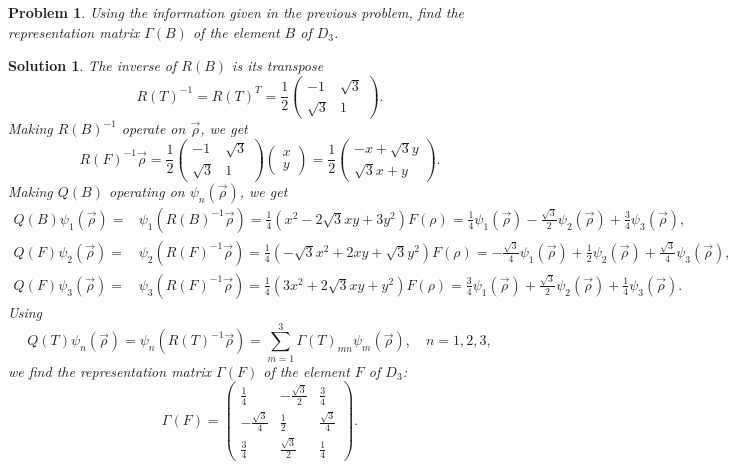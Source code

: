 \documentclass[UTF8,10pt,a4paper]{article}
\theoremstyle{Problem}
\newtheorem{prob}{Problem}
\theoremstyle{Solution}
\newtheorem*{sol}{Solution}
\begin{document}
\begin{prob}
    Using the information given in the previous problem, find the representation matrix $\Gamma(B)$ of the element $B$ of $D_3$.
\end{prob}
\begin{sol}
    The inverse of $R(B)$ is its transpose
    \begin{equation}
        R(T)^{-1}=R(T)^T=\frac{1}{2}\left(\begin{matrix}
            -1&\sqrt{3}\\
            \sqrt{3}&1
        \end{matrix}\right).
    \end{equation}
    Making $R(B)^{-1}$ operate on $\vec{\rho}$, we get
    \begin{equation}
        R(F)^{-1}\vec{\rho}=\frac{1}{2}\left(\begin{matrix}
            -1&\sqrt{3}\\
            \sqrt{3}&1
        \end{matrix}\right)\left(\begin{matrix}
            x\\
            y
        \end{matrix}\right)=\frac{1}{2}\left(\begin{matrix}
            -x+\sqrt{3}y\\
            \sqrt{3}x+y
        \end{matrix}\right).
    \end{equation}
    Making $Q(B)$ operating on $\psi_n(\vec{\rho})$, we get
    \begin{align}
        Q(B)\psi_1(\vec{\rho})=&\psi_1(R(B)^{-1}\vec{\rho})=\frac{1}{4}(x^2-2\sqrt{3}xy+3y^2)F(\rho)=\frac{1}{4}\psi_1(\vec{\rho})-\frac{\sqrt{3}}{2}\psi_2(\vec{\rho})+\frac{3}{4}\psi_3(\vec{\rho}),\\
        Q(F)\psi_2(\vec{\rho})=&\psi_2(R(F)^{-1}\vec{\rho})=\frac{1}{4}(-\sqrt{3}x^2+2xy+\sqrt{3}y^2)F(\rho)=-\frac{\sqrt{3}}{4}\psi_1(\vec{\rho})+\frac{1}{2}\psi_2(\vec{\rho})+\frac{\sqrt{3}}{4}\psi_3(\vec{\rho}),\\
        Q(F)\psi_3(\vec{\rho})=&\psi_3(R(F)^{-1}\vec{\rho})=\frac{1}{4}(3x^2+2\sqrt{3}xy+y^2)F(\rho)=\frac{3}{4}\psi_1(\vec{\rho})+\frac{\sqrt{3}}{2}\psi_2(\vec{\rho})+\frac{1}{4}\psi_3(\vec{\rho}).
    \end{align}
    Using
    \begin{equation}
        Q(T)\psi_n(\vec{\rho})=\psi_n(R(T)^{-1}\vec{\rho})=\sum_{m=1}^3\Gamma(T)_{mn}\psi_m(\vec{\rho}),\quad n=1,2,3,
    \end{equation}
    we find the representation matrix $\Gamma(F)$ of the element $F$ of $D_3$:
    \begin{equation}
        \Gamma(F)=\left(\begin{matrix}
            \frac{1}{4}&-\frac{\sqrt{3}}{2}&\frac{3}{4}\\
            -\frac{\sqrt{3}}{4}&\frac{1}{2}&\frac{\sqrt{3}}{4}\\
            \frac{3}{4}&\frac{\sqrt{3}}{2}&\frac{1}{4}
        \end{matrix}\right).
    \end{equation}
\end{sol}
\end{document}
